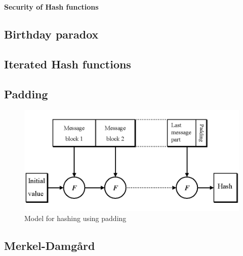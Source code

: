 \textbf{Security of Hash functions} 



\subsection{Birthday paradox}



\subsection{Iterated Hash functions}

\subsection{Padding}
\begin{figure}[H]
  \begin{centering}
    \includegraphics[scale=0.3]{images/10-padding}
    \caption{Model for hashing using padding}
  \end{centering}
\end{figure}
\subsection{Merkel-Damgård}

